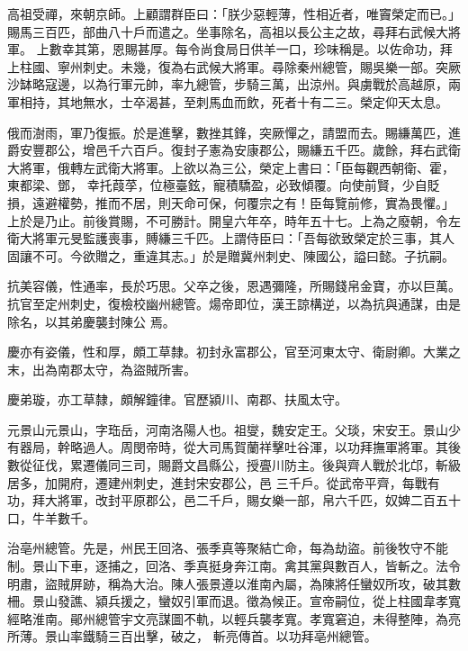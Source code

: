 \begin{pinyinscope}
 高祖受禪，來朝京師。上顧謂群臣曰：「朕少惡輕薄，性相近者，唯竇榮定而已。」賜馬三百匹，部曲八十戶而遣之。坐事除名，高祖以長公主之故，尋拜右武候大將軍。
 上數幸其第，恩賜甚厚。每令尚食局日供羊一口，珍味稱是。以佐命功，拜上柱國、寧州刺史。未幾，復為右武候大將軍。尋除秦州總管，賜吳樂一部。突厥沙缽略寇邊，以為行軍元帥，率九總管，步騎三萬，出涼州。與虜戰於高越原，兩軍相持，其地無水，士卒渴甚，至刺馬血而飲，死者十有二三。榮定仰天太息。



 俄而澍雨，軍乃復振。於是進擊，數挫其鋒，突厥憚之，請盟而去。賜縑萬匹，進爵安豐郡公，增邑千六百戶。復封子憲為安康郡公，賜縑五千匹。歲餘，拜右武衛大將軍，俄轉左武衛大將軍。上欲以為三公，榮定上書曰：「臣每觀西朝衛、霍，東都梁、鄧，
 幸托葭莩，位極臺鉉，寵積驕盈，必致傾覆。向使前賢，少自貶損，遠避權勢，推而不居，則天命可保，何覆宗之有！臣每覽前修，實為畏懼。」上於是乃止。前後賞賜，不可勝計。開皇六年卒，時年五十七。上為之廢朝，令左衛大將軍元旻監護喪事，賻縑三千匹。上謂侍臣曰：「吾每欲致榮定於三事，其人固讓不可。今欲贈之，重違其志。」於是贈冀州刺史、陳國公，謚曰懿。子抗嗣。



 抗美容儀，性通率，長於巧思。父卒之後，恩遇彌隆，所賜錢帛金寶，亦以巨萬。抗官至定州刺史，復檢校幽州總管。煬帝即位，漢王諒構逆，以為抗與通謀，由是除名，以其弟慶襲封陳公
 焉。



 慶亦有姿儀，性和厚，頗工草隸。初封永富郡公，官至河東太守、衛尉卿。大業之末，出為南郡太守，為盜賊所害。



 慶弟璇，亦工草隸，頗解鐘律。官歷潁川、南郡、扶風太守。



 元景山元景山，字珤岳，河南洛陽人也。祖燮，魏安定王。父琰，宋安王。景山少有器局，幹略過人。周閔帝時，從大司馬賀蘭祥擊吐谷渾，以功拜撫軍將軍。其後數從征伐，累遷儀同三司，賜爵文昌縣公，授亹川防主。後與齊人戰於北邙，斬級居多，加開府，遷建州刺史，進封宋安郡公，邑
 三千戶。從武帝平齊，每戰有功，拜大將軍，改封平原郡公，邑二千戶，賜女樂一部，帛六千匹，奴婢二百五十口，牛羊數千。



 治亳州總管。先是，州民王回洛、張季真等聚結亡命，每為劫盜。前後牧守不能制。景山下車，逐捕之，回洛、季真挺身奔江南。禽其黨與數百人，皆斬之。法令明肅，盜賊屏跡，稱為大治。陳人張景遵以淮南內屬，為陳將任蠻奴所攻，破其數柵。景山發譙、潁兵援之，蠻奴引軍而退。徵為候正。宣帝嗣位，從上柱國韋孝寬經略淮南。鄖州總管宇文亮謀圖不軌，以輕兵襲孝寬。孝寬窘迫，未得整陣，為亮所薄。景山率鐵騎三百出擊，破之，
 斬亮傳首。以功拜亳州總管。




\end{pinyinscope}
